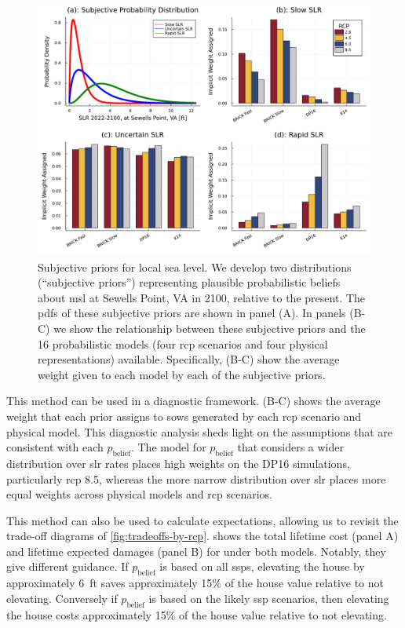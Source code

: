 \documentclass[12pt]{article}
\begin{document}
\begin{figure}
    \centering
    \includegraphics[width=\textwidth]{lsl-priors-weights}
    \caption{
        Subjective priors for local sea level.
        We develop two distributions (``subjective priors'') representing plausible probabilistic beliefs about \gls{msl} at Sewells Point, VA in 2100, relative to the present.
        The \glspl{pdf} of these subjective priors are shown in panel (A).
        In panels (B-C) we show the relationship between these subjective priors and the 16 probabilistic models (four \gls{rcp} scenarios and four physical representations) available.
        Specifically, (B-C) show the average weight given to each model by each of the subjective priors.
    }\label{fig:lsl-priors-weights}
\end{figure}

This method can be used in a diagnostic framework.
(B-C) shows the average weight that each prior assigns to \glspl{sow} generated by each \gls{rcp} scenario and physical model.
This diagnostic analysis sheds light on the assumptions that are consistent with each $p_\mathrm{belief}$.
The model for $p_\mathrm{belief}$ that considers a wider distribution over \gls{slr} rates places high weights on the DP16 simulations, particularly \gls{rcp} 8.5, whereas the more narrow distribution over \gls{slr} places more equal weights across physical models and \gls{rcp} scenarios.

This method can also be used to calculate expectations, allowing us to revisit the trade-off diagrams of \cref{fig:tradeoffs-by-rcp}.
 shows the total lifetime cost (panel A) and lifetime expected damages (panel B) for under both models.
Notably, they give different guidance.
If $p_\text{belief}$ is based on all \glspl{ssp}, elevating the house by approximately \SI{6}{ft} saves approximately 15\% of the house value relative to not elevating.
Conversely if $p_\text{belief}$ is based on the likely \gls{ssp} scenarios, then elevating the house costs approximately 15\% of the house value relative to not elevating.
\end{document}
